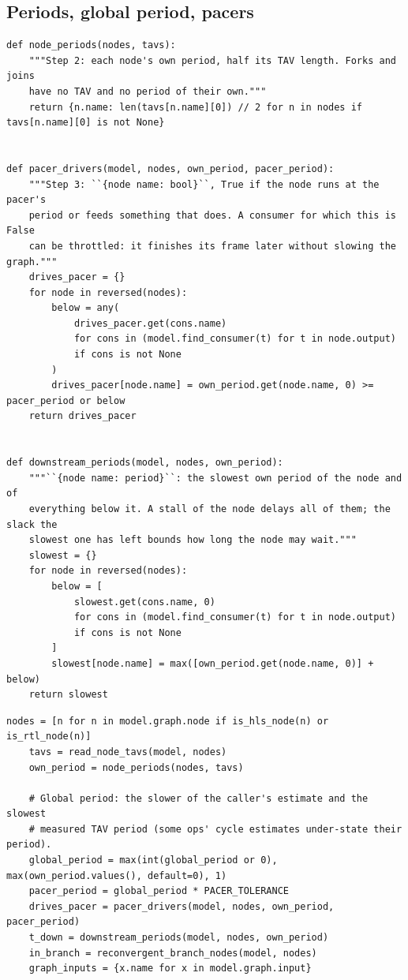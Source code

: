 \documentclass[10pt,a4paper]{article}
\begin{document}
\subsection{Periods, global period, pacers}

\begin{lstlisting}[firstnumber=626,title={\texttt{src/finn/transformation/fpgadataflow/derive\_characteristic.py}, lines 626--659}]
def node_periods(nodes, tavs):
    """Step 2: each node's own period, half its TAV length. Forks and joins
    have no TAV and no period of their own."""
    return {n.name: len(tavs[n.name][0]) // 2 for n in nodes if tavs[n.name][0] is not None}


def pacer_drivers(model, nodes, own_period, pacer_period):
    """Step 3: ``{node name: bool}``, True if the node runs at the pacer's
    period or feeds something that does. A consumer for which this is False
    can be throttled: it finishes its frame later without slowing the graph."""
    drives_pacer = {}
    for node in reversed(nodes):
        below = any(
            drives_pacer.get(cons.name)
            for cons in (model.find_consumer(t) for t in node.output)
            if cons is not None
        )
        drives_pacer[node.name] = own_period.get(node.name, 0) >= pacer_period or below
    return drives_pacer


def downstream_periods(model, nodes, own_period):
    """``{node name: period}``: the slowest own period of the node and of
    everything below it. A stall of the node delays all of them; the slack the
    slowest one has left bounds how long the node may wait."""
    slowest = {}
    for node in reversed(nodes):
        below = [
            slowest.get(cons.name, 0)
            for cons in (model.find_consumer(t) for t in node.output)
            if cons is not None
        ]
        slowest[node.name] = max([own_period.get(node.name, 0)] + below)
    return slowest
\end{lstlisting}
\begin{lstlisting}[firstnumber=870,title={\texttt{src/finn/transformation/fpgadataflow/derive\_characteristic.py}, lines 870--881}]
    nodes = [n for n in model.graph.node if is_hls_node(n) or is_rtl_node(n)]
    tavs = read_node_tavs(model, nodes)
    own_period = node_periods(nodes, tavs)

    # Global period: the slower of the caller's estimate and the slowest
    # measured TAV period (some ops' cycle estimates under-state their period).
    global_period = max(int(global_period or 0), max(own_period.values(), default=0), 1)
    pacer_period = global_period * PACER_TOLERANCE
    drives_pacer = pacer_drivers(model, nodes, own_period, pacer_period)
    t_down = downstream_periods(model, nodes, own_period)
    in_branch = reconvergent_branch_nodes(model, nodes)
    graph_inputs = {x.name for x in model.graph.input}
\end{lstlisting}
\end{document}
